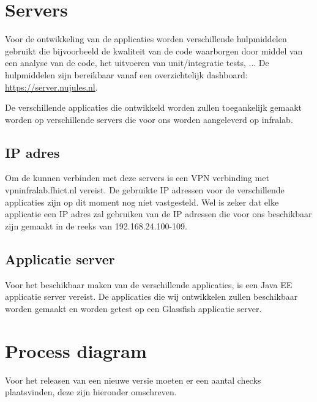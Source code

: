 \section{Servers}
Voor de ontwikkeling van de applicaties worden verschillende hulpmiddelen gebruikt die bijvoorbeeld de kwaliteit van de code waarborgen door middel van een analyse van de code, het uitvoeren van unit/integratie tests, ...
De hulpmiddelen zijn bereikbaar vanaf een overzichtelijk dashboard: \href{https://server.nujules.nl}{https://server.nujules.nl}.

De verschillende applicaties die ontwikkeld worden zullen toegankelijk gemaakt worden op verschillende servers die voor ons worden aangeleverd op infralab.

\subsection{IP adres}

Om de kunnen verbinden met deze servers is een VPN verbinding met vpninfralab.fhict.nl vereist. De gebruikte IP adressen voor de verschillende applicaties zijn op dit moment nog niet vastgesteld. Wel is zeker dat elke applicatie een IP adres zal gebruiken van de IP adressen die voor ons beschikbaar zijn gemaakt in de reeks van 192.168.24.100-109.

\subsection{Applicatie server}
Voor het beschikbaar maken van de verschillende applicaties, is een Java EE applicatie server vereist. De applicaties die wij ontwikkelen zullen beschikbaar worden gemaakt en worden getest op een Glassfish applicatie server.

\section{Process diagram}
Voor het releasen van een nieuwe versie moeten er een aantal  checks plaatsvinden, deze zijn hieronder omschreven.
